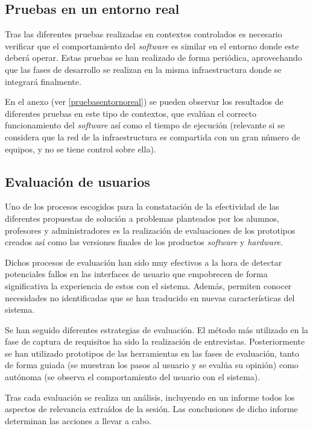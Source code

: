\subsection{Pruebas en un entorno real}

Tras las diferentes pruebas realizadas en contextos controlados es necesario verificar que el comportamiento del \textit{software} es similar en el entorno donde este deberá operar. Estas pruebas se han realizado de forma periódica, aprovechando que las fases de desarrollo se realizan en la misma infraestructura donde se integrará finalmente.

En el anexo  (ver \ref{pruebasentornoreal}) se pueden observar los resultados de diferentes pruebas en este tipo de contextos, que evalúan el correcto funcionamiento del \textit{software} así como el tiempo de ejecución (relevante si se considera que la red de la infraestructura es compartida con un gran número de equipos, y no se tiene control sobre ella).

\subsection{Evaluación de usuarios}

Uno de los procesos escogidos para la constatación de la efectividad de las diferentes propuestas de solución a problemas planteados por los alumnos, profesores y administradores es la realización de evaluaciones de los prototipos creados así como las versiones finales de los productos \textit{software} y \textit{hardware}.

Dichos procesos de evaluación han sido muy efectivos a la hora de detectar potenciales fallos en las interfaces de usuario que empobrecen de forma significativa la experiencia de estos con el sistema. Además, permiten conocer necesidades no identificadas que se han traducido en nuevas características del sistema.

Se han seguido diferentes estrategias de evaluación. El método más utilizado en la fase de captura de requisitos ha sido la realización de entrevistas. Posteriormente se han utilizado prototipos de las herramientas en las fases de evaluación, tanto de forma guiada (se muestran los pasos al usuario y se evalúa su opinión) como autónoma (se observa el comportamiento del usuario con el sistema).

Tras cada evaluación se realiza un análisis, incluyendo en un informe todos los aspectos de relevancia extraídos de la sesión. Las conclusiones de dicho informe determinan las acciones a llevar a cabo.

